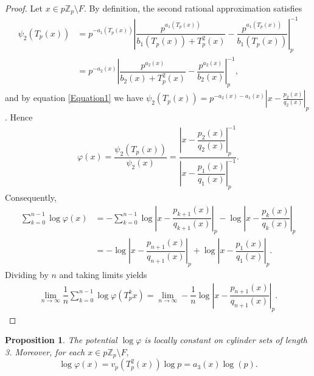 \documentclass[11pt]{amsart}
\newtheorem{proposition}[theorem]{Proposition}
\theoremstyle{remark}
\numberwithin{equation}{section}
\newcommand{\Z}{\mathbb{Z}}
\begin{document}
\begin{proof}
    Let $x\in p\Z_{p}\setminus F$. By definition, the second rational approximation satisfies
    \begin{align*}
        \psi_{2}(T_{p}(x))&=p^{-a_{1}(T_{p}(x))}\left|\dfrac{p^{a_{1}(T_{p}(x))}}{b_{1}(T_{p}(x))+T_{p}^{2}(x)}-\dfrac{p^{a_{1}(T_{p}(x))}}{b_{1}(T_{p}(x))}\right|_{p}^{-1}\\&=p^{-a_{2}(x)}\left|\dfrac{p^{a_{2}(x)}}{b_{2}(x)+T_{p}^{2}(x)}-\dfrac{p^{a_{2}(x)}}{b_{2}(x)}\right|_{p}^{-1},
    \end{align*} and by equation \eqref{Equation1} we have $\psi_{2}(T_{p}(x))=p^{-a_{2}(x)-a_{1}(x)}\left|x-\frac{p_{2}(x)}{q_{2}(x)}\right|_{p}$. Hence
    \begin{align*}
        \varphi(x)=\dfrac{\psi_{2}(T_{p}(x))}{\psi_{2}(x)}=\dfrac{\left|x-\dfrac{p_{2}(x)}{q_{2}(x)}\right|_{p}^{-1}}{\left|x-\dfrac{p_{1}(x)}{q_{1}(x)}\right|_{p}^{-1}}.
    \end{align*} Consequently,
    \begin{align*}
        \sum^{n-1}_{k=0}\log \varphi(x)&=-\sum^{n-1}_{k=0}\log\left|x-\dfrac{p_{k+1}(x)}{q_{k+1}(x)}\right|_{p}-\log\left|x-\dfrac{p_{k}(x)}{q_{k}(x)}\right|_{p}\\
        &= -\log\left|x-\dfrac{p_{n+1}(x)}{q_{n+1}(x)}\right|_{p}+\log\left|x-\dfrac{p_{1}(x)}{q_{1}(x)}\right|_{p}.
    \end{align*} Dividing by $n$ and taking limits yields
    \begin{align*}
        \lim_{n\rightarrow \infty}\dfrac{1}{n}\sum^{n-1}_{k=0}\log\varphi\left(T_p^kx\right)=\lim_{n\rightarrow \infty}-\dfrac{1}{n}\log\left|x-\dfrac{p_{n+1}(x)}{q_{n+1}(x)}\right|_{p}.
    \end{align*}
\end{proof}

\begin{proposition}\label{Proposition 52}
    The potential $\log \varphi$ is locally constant on cylinder sets of length 3. Moreover, for each $x\in p\Z_{p}\setminus F,$
   $$\log \varphi(x)=v_{p}\left(T^{2}_{p}(x)\right)\log p=a_{3}(x)\log(p).$$
\end{proposition}
\end{document}
